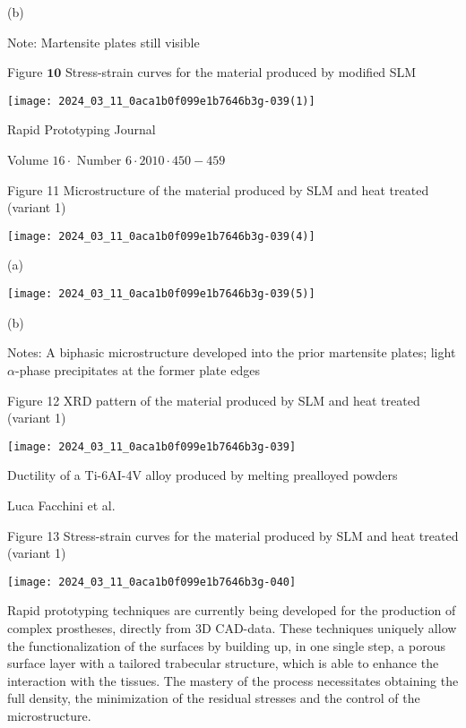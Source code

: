 \documentclass[10pt]{article}
\begin{document}
(b)

Note: Martensite plates still visible

Figure $\mathbf{1 0}$ Stress-strain curves for the material produced by modified SLM

\begin{center}
\texttt{[image: 2024\_03\_11\_0aca1b0f099e1b7646b3g-039(1)]}
\end{center}

Rapid Prototyping Journal

Volume $16 \cdot$ Number $6 \cdot 2010 \cdot 450-459$

Figure 11 Microstructure of the material produced by SLM and heat treated (variant 1)

\begin{center}
\texttt{[image: 2024\_03\_11\_0aca1b0f099e1b7646b3g-039(4)]}
\end{center}

(a)

\begin{center}
\texttt{[image: 2024\_03\_11\_0aca1b0f099e1b7646b3g-039(5)]}
\end{center}

(b)

Notes: A biphasic microstructure developed into the prior martensite plates; light $\alpha$-phase precipitates at the former plate edges

Figure 12 XRD pattern of the material produced by SLM and heat treated (variant 1)

\begin{center}
\texttt{[image: 2024\_03\_11\_0aca1b0f099e1b7646b3g-039]}
\end{center}

Ductility of a Ti-6AI-4V alloy produced by melting prealloyed powders

Luca Facchini et al.

Figure 13 Stress-strain curves for the material produced by SLM and heat treated (variant 1)

\begin{center}
\texttt{[image: 2024\_03\_11\_0aca1b0f099e1b7646b3g-040]}
\end{center}

Rapid prototyping techniques are currently being developed for the production of complex prostheses, directly from 3D CAD-data. These techniques uniquely allow the functionalization of the surfaces by building up, in one single step, a porous surface layer with a tailored trabecular structure, which is able to enhance the interaction with the tissues. The mastery of the process necessitates obtaining the full density, the minimization of the residual stresses and the control of the microstructure.
\end{document}
